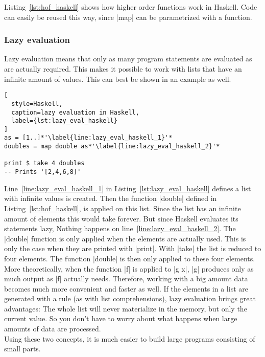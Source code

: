 Listing~\ref{lst:hof_haskell} shows how higher order functions work in Haskell.
Code can easily be reused this way, since |map| can be parametrized with a
function.

\subsubsection{Lazy evaluation} %
\label{subsub:Evaluation}
Lazy evaluation means that only as many program statements are evaluated as are
actually required. This makes it possible to work with lists that have an
infinite amount of values. This can best be shown in an example as well.

\begin{lstlisting}[
  style=Haskell,
  caption=lazy evaluation in Haskell,
  label={lst:lazy_eval_haskell}
]
as = [1..]*'\label{line:lazy_eval_haskell_1}'*
doubles = map double as*'\label{line:lazy_eval_haskell_2}'*

print $ take 4 doubles 
-- Prints '[2,4,6,8]'
\end{lstlisting}

Line~\ref{line:lazy_eval_haskell_1} in Listing~\ref{lst:lazy_eval_haskell}
defines a list with infinite values is created. Then the function |double|
defined in Listing~\ref{lst:hof_haskell}, is applied on this list. Since the
list has an infinite amount of elements this would take forever. But since
Haskell evaluates its statements lazy, Nothing happens on
line~\ref{line:lazy_eval_haskell_2}. The |double| function is only applied when
the elements are actually used. This is only the case when they are printed
with |print|. With |take| the list is reduced to four elements. The function
|double| is then only applied to these four elements. \\ More theoretically,
when the function |f| is applied to |g x|, |g| produces only as much output as
|f| actually needs. Therefore, working with a big amount data becomes much more
convenient and faster as well. If the elements in a list are generated with a
rule (as with list comprehensions), lazy evaluation brings great advantages:
The whole list will never materialize in the memory, but only the current
value. So you don't have to worry about what happens when large amounts of data
are processed. \\ Using these two concepts, it is much easier to build large
programs consisting of small parts.

